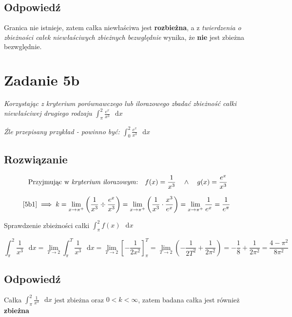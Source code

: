 \documentclass{article}
\newcommand{\Integral}[4]{\int_{#1}^{#2} \! #3 \, \mathop{}\!\mathrm{d}#4}
\DeclareMathOperator{\?}{?}
\begin{document}
\subsection*{Odpowiedź}

Granica nie istnieje, zatem całka niewłaściwa jest \textbf{rozbieżna},
a z \textit{twierdzenia o zbieżności całek niewłaściwych zbieżnych bezwględnie} wynika, że
\textbf{nie} jest zbieżna bezwględnie.

\clearpage

\section*{Zadanie 5b}

\textit{Korzystając z kryterium porównawczego lub ilorazowego zbadać zbieżność całki
niewłaściwej drugiego rodzaju $\displaystyle \Integral{\pi}{2}{\frac{e^x}{x^3}}{x}$}

\textit{\tiny Źle przepisany przykład - powinno być: $\displaystyle \Integral{0}{2}{\frac{e^x}{x^3}}{x}$}

\subsection*{Rozwiązanie}

\setcounter{equation}{0}

\begin{equation} \label{5b1}
   \textrm{ Przyjmując w \textit{kryterium ilorazowym}:\quad}
   f(x) = \frac{1}{x^3} \quad\land\quad g(x) = \frac{e^x}{x^3}
\end{equation}

\begin{equation}
   \ref{5b1} \implies k = \lim_{x \to \pi^+}{\left( \frac{1}{x^3} \div \frac{e^x}{x^3} \right)}
     = \lim_{x \to \pi^+}{\left( \frac{1}{x^3} \cdot \frac{x^3}{e^x} \right)}
     = \lim_{x \to \pi^+}{\frac{1}{e^x}}
     = \frac{1}{e^\pi}
\end{equation}

\vspace{1.5em}

Sprawdzenie zbieżności całki $\Integral{\pi}{2}{f(x)}{x}$

\begin{equation}
   \Integral{\pi}{2}{\frac{1}{x^3}}{x} =
   \lim_{T \to 2}{\Integral{\pi}{T}{\frac{1}{x^3}}{x}} =
   \lim_{T \to 2}{\left[ -\frac{1}{2x^2} \right]_\pi^T} =
   \lim_{T \to 2}{\left( -\frac{1}{2T^2} + \frac{1}{2\pi^2} \right)} =
   -\frac{1}{8} + \frac{1}{2\pi^2} = \frac{4-\pi^2}{8\pi^2}
\end{equation}

\subsection*{Odpowiedź}

Całka $\displaystyle \Integral{\pi}{2}{\frac{1}{x^3}}{x} $ jest zbieżna oraz
$0 < k < \infty $, zatem badana całka jest również \textbf{zbieżna}
\end{document}
